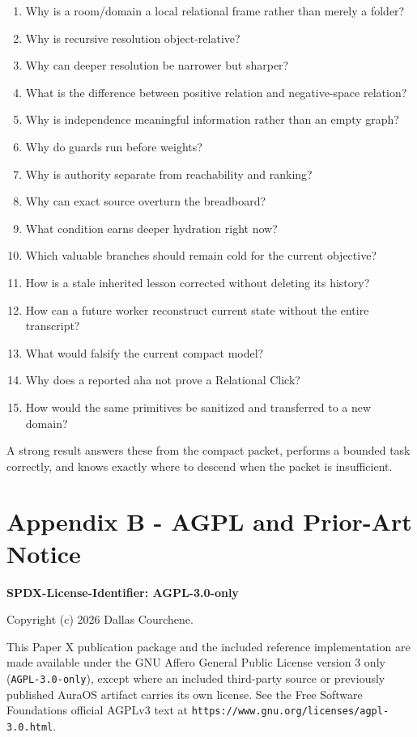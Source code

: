 \documentclass[
  10pt,
  letterpaper,
]{article}
\providecommand{\tightlist}{%
  \setlength{\itemsep}{0pt}\setlength{\parskip}{0pt}}
\begin{document}
\begin{enumerate}
\def\labelenumi{\arabic{enumi}.}
\tightlist
\item
  Why is a room/domain a local relational frame rather than merely a
  folder?
\item
  Why is recursive resolution object-relative?
\item
  Why can deeper resolution be narrower but sharper?
\item
  What is the difference between positive relation and negative-space
  relation?
\item
  Why is independence meaningful information rather than an empty graph?
\item
  Why do guards run before weights?
\item
  Why is authority separate from reachability and ranking?
\item
  Why can exact source overturn the breadboard?
\item
  What condition earns deeper hydration right now?
\item
  Which valuable branches should remain cold for the current objective?
\item
  How is a stale inherited lesson corrected without deleting its
  history?
\item
  How can a future worker reconstruct current state without the entire
  transcript?
\item
  What would falsify the current compact model?
\item
  Why does a reported \textquotesingle aha\textquotesingle{} not prove a
  Relational Click?
\item
  How would the same primitives be sanitized and transferred to a new
  domain?
\end{enumerate}

A strong result answers these from the compact packet, performs a
bounded task correctly, and knows exactly where to descend when the
packet is insufficient.

\section{Appendix B - AGPL and Prior-Art
Notice}\label{appendix-b---agpl-and-prior-art-notice}

\textbf{SPDX-License-Identifier: AGPL-3.0-only}

Copyright (c) 2026 Dallas Courchene.

This Paper X publication package and the included reference
implementation are made available under the GNU Affero General Public
License version 3 only (\nolinkurl{AGPL-3.0-only}), except where an
included third-party source or previously published AuraOS artifact
carries its own license. See the Free Software
Foundation\textquotesingle s official AGPLv3 text at
\nolinkurl{https://www.gnu.org/licenses/agpl-3.0.html}.
\end{document}
